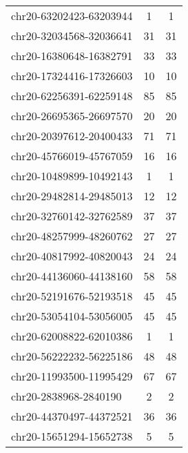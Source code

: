 \begin{longtable}{lSS}
	chr20-63202423-63203944 & 1      & 1                                         \\
	chr20-32034568-32036641 & 31     & 31                                        \\
	chr20-16380648-16382791 & 33     & 33                                        \\
	chr20-17324416-17326603 & 10     & 10                                        \\
	chr20-62256391-62259148 & 85     & 85                                        \\
	chr20-26695365-26697570 & 20     & 20                                        \\
	chr20-20397612-20400433 & 71     & 71                                        \\
	chr20-45766019-45767059 & 16     & 16                                        \\
	chr20-10489899-10492143 & 1      & 1                                         \\
	chr20-29482814-29485013 & 12     & 12                                        \\
	chr20-32760142-32762589 & 37     & 37                                        \\
	chr20-48257999-48260762 & 27     & 27                                        \\
	chr20-40817992-40820043 & 24     & 24                                        \\
	chr20-44136060-44138160 & 58     & 58                                        \\
	chr20-52191676-52193518 & 45     & 45                                        \\
	chr20-53054104-53056005 & 45     & 45                                        \\
	chr20-62008822-62010386 & 1      & 1                                         \\
	chr20-56222232-56225186 & 48     & 48                                        \\
	chr20-11993500-11995429 & 67     & 67                                        \\
	chr20-2838968-2840190   & 2      & 2                                         \\
	chr20-44370497-44372521 & 36     & 36                                        \\
	chr20-15651294-15652738 & 5      & 5                                         \\

\end{longtable}
